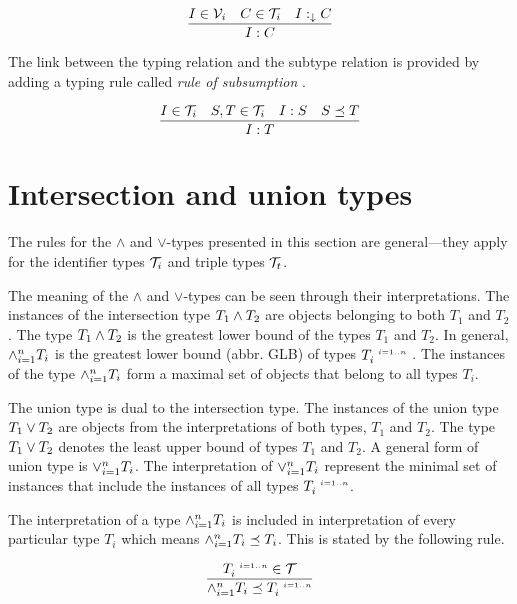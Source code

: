 \documentclass[runningheads]{llncs}
\newcommand{\s}{\scriptscriptstyle\ \,}
\newcommand{\darr}{\downarrow}
\newcommand{\V}{{\cal V}}
\newcommand{\T}{{\cal T}}
\begin{document}
\begin{equation}
\dfrac{I\in\V_i\quad\/C\in\T_i\quad\/I:_\darr\/C}
      {I:C}
\end{equation}

The link between the typing relation and the subtype relation is
provided by adding a typing rule called \emph{rule of subsumption}
\cite{Pierce2002}.

\begin{equation}
\label{rul:typing-subsumption}
\dfrac{I\in\T_i\quad\/S,T\in\T_i\quad\/I:S\quad\/S\preceq\/T}
      {I:T}    
\end{equation}








\section{Intersection and union types\label{sec:intsc-union}}

The rules for the $\land$ and $\lor$-types presented in this section
are general---they apply for the identifier types $\T_i$ and triple
types $\T_t$.

The meaning of the $\land$ and $\lor$-types can be seen through
their interpretations. The instances of the intersection type
$T_1\land\/T_2$ are objects belonging to both $T_1$ and $T_2$. The
type $T_1\land\/T_2$ is the greatest lower bound of the types $T_1$
and $T_2$. In general, $\land_{i=1}^n\/T_i$ is the greatest lower
bound (abbr. GLB) of types $T_i^{\s\/i=1..n}$
\cite{Pierce1991,Pierce1996}. The instances of the type
$\land_{i=1}^n\/T_i$ form a maximal set of objects that belong to
all types $T_i$.

The union type is dual to the intersection type. The instances of
the union type $T_1\lor\/T_2$ are objects from the interpretations of
both types, $T_1$ and $T_2$. The type $T_1\lor\/T_2$ denotes the least
upper bound of types $T_1$ and $T_2$. A general form of union type is
$\lor_{i=1}^n\/T_i$. The interpretation of $\lor_{i=1}^n\/T_i$
represent the minimal set of instances that include the instances of
all types $T_i^{\s\/i=1..n}$.

The interpretation of a type $\land_{i=1}^n\/T_i$ is included in
interpretation of every particular type $T_i$ which means
$\land_{i=1}^n\/T_i\preceq\/T_i$. This is stated by the following
rule.

\begin{equation}
\label{rul:land-preceq-elems}
\dfrac{T_i^{\s\/i=1..n}\in\T}
      {\land_{i=1}^n\/T_i\preceq\/T_i^{\s\/i=1..n}} 
\end{equation}
\end{document}
